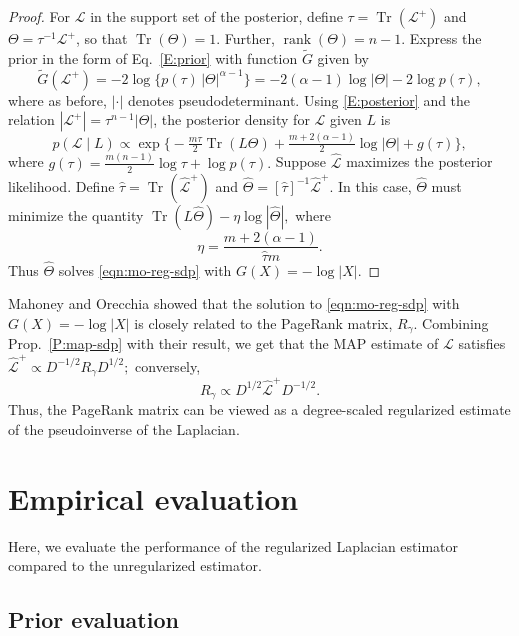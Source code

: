 \documentclass[12pt]{article}
\DeclareMathOperator*{\Tr}{Tr}
\DeclareMathOperator*{\rank}{rank}
\theoremstyle{plain}
\begin{document}
\begin{proof}
For $\mathcal{L}$ in the support set of the posterior,
define $\tau = \Tr(\mathcal{L}^+)$ and $\Theta  = \tau^{-1}
\mathcal{L}^+$, so that $\Tr(\Theta) = 1$.  Further, $\rank(\Theta) = n - 1$.
Express the prior in the form of Eq.~\eqref{E:prior} with function
$\tilde G$ given by
\[
  \tilde G(\mathcal{L}^+)
    = -2 \log \{ p(\tau) \, |\Theta|^{\alpha - 1} \}
    = -2(\alpha - 1) \log |\Theta| - 2 \log p(\tau),
\]
where as before, $|\cdot|$ denotes pseudodeterminant.  Using
\eqref{E:posterior} and the relation
$|\mathcal{L}^+| = \tau^{n-1} |\Theta|$, the posterior
density for $\mathcal{L}$ given $L$ is
\[
  p(\mathcal{L} \mid L)
    \propto
      \exp\Big\{
        -\tfrac{m \tau}{2} \Tr(L \Theta)
        +\tfrac{m + 2(\alpha - 1)}{2} \log | \Theta |
        + g(\tau)\Big\},
\]
where
\(
  g(\tau)
    = \tfrac{m (n-1)}{2} \log \tau
        + \log p(\tau).
\)
Suppose $\mathcal{\hat L}$ maximizes the
posterior likelihood.  Define $\hat \tau = \Tr(\mathcal{\hat L}^+)$
and $\hat \Theta = [\hat \tau]^{-1} \mathcal{\hat L}^{+}$.
In this case, $\hat \Theta$ must minimize the quantity
\(
  \Tr(L \hat \Theta) - \eta \log |\hat \Theta|,
\)
where
\begin{equation}\label{E:eta}
  \eta
    = \frac{m + 2(\alpha - 1)}{\hat \tau m}.
\end{equation}
Thus $\hat \Theta$ solves \eqref{eqn:mo-reg-sdp} with $G(X) = - \log |X|$.
\end{proof}

Mahoney and Orecchia showed that the solution to
\eqref{eqn:mo-reg-sdp} with $G(X) = - \log |X|$
is closely related to the PageRank matrix, $R_\gamma$.  Combining
Prop.~\ref{P:map-sdp} with their result, we get that the MAP estimate
of $\mathcal{L}$ satisfies
\(
  \mathcal{\hat L}^+
    \propto D^{-1/2} R_\gamma D^{1/2};
\)
conversely,
\[
  R_\gamma
    \propto
      D^{1/2} \mathcal{\hat L}^+ D^{-1/2}.
\]
Thus, the PageRank matrix
can be viewed as a degree-scaled regularized estimate of the
pseudoinverse of the Laplacian.


\section{Empirical evaluation}
\label{sxn:empirical}

Here, we evaluate the performance of the regularized Laplacian
estimator compared to the unregularized estimator.

\subsection{Prior evaluation}\label{S:prior-evaluation}
\end{document}
